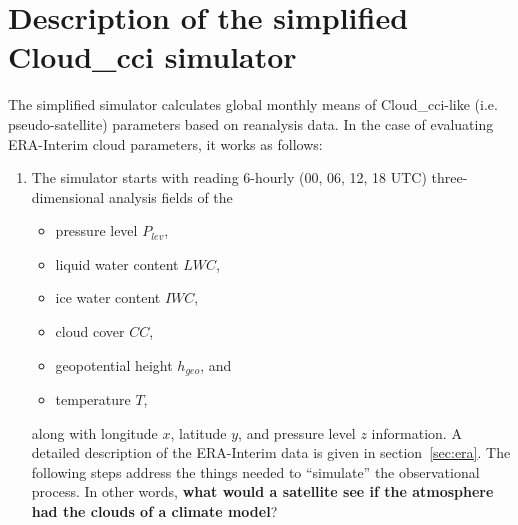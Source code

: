 
\section{Description of the simplified Cloud\_cci simulator}\label{simpsimu}

The simplified simulator calculates global monthly means of Cloud\_cci-like (i.e.
pseudo-satellite) parameters based on reanalysis data.
In the case of evaluating ERA-Interim cloud parameters, it works as follows:
\begin{enumerate}[label=(\alph*)]


 \item\label{it:readdata} 
The simulator starts with reading 6-hourly (00, 06, 12, 18 UTC)
three-dimensional analysis fields of the
\begin{itemize}
	\item pressure level $P_{lev}$,
	\item liquid water content $LWC$,
	\item ice water content $IWC$,
	\item cloud cover $CC$,
	\item geopotential height $h_{geo}$, and
	\item temperature $T$,
\end{itemize}
along with longitude $x$, latitude $y$, and pressure level $z$ information. 
A detailed description of the ERA-Interim data is given
in section~\ref{sec:era}.
The following steps address the things needed to ``simulate'' the observational process.
In other words, \textbf{what would a satellite see if the atmosphere had the clouds
of a climate model}?





\end{enumerate}
